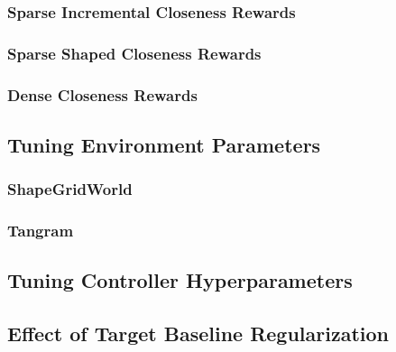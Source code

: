 
\subsubsection{Sparse Incremental Closeness Rewards}
\label{sec:sparse-incremental-closeness}


\subsubsection{Sparse Shaped Closeness Rewards}
\label{sec:sparse-shaped-closeness}


\subsubsection{Dense Closeness Rewards}
\label{sec:dense-closeness}


\subsection{Tuning Environment Parameters}
\label{sec:env-hyperparameters}


\subsubsection{ShapeGridWorld}
\label{sec:sgw-parameters}


\subsubsection{Tangram}
\label{sec:tangram-parameters}


\subsection{Tuning Controller Hyperparameters}
\label{sec:icem-hyperparameters}


\subsection{Effect of Target Baseline Regularization}
\label{sec:reg-alpha}


